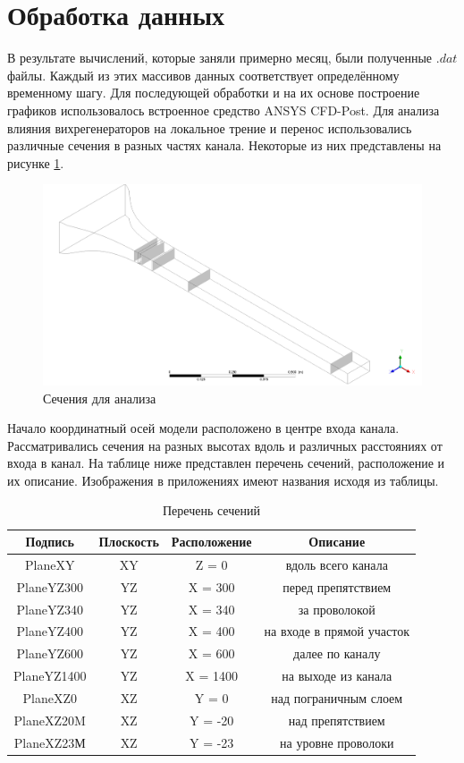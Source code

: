 \section{Обработка данных}
	В результате вычислений, которые заняли примерно месяц, были полученные $.dat$ файлы. Каждый из этих массивов данных соответствует определённому временному шагу. Для последующей обработки и на их основе построение графиков использовалось встроенное средство ANSYS CFD-Post. Для анализа влияния вихрегенераторов на локальное трение и перенос использовались различные сечения в разных частях канала. Некоторые из них представлены на рисунке \ref{fig:planesforanalysis}. 
	\begin{figure}[H]
		\centering
		\includegraphics[width=0.9\linewidth]{../Assets/1}
		\caption{Сечения для анализа}
		\label{fig:planesforanalysis}
	\end{figure}
	
	Начало координатный осей модели расположено в центре входа канала. Рассматривались сечения на разных высотах вдоль и различных расстояниях от входа в канал. На таблице ниже представлен перечень сечений, расположение и их описание. Изображения в приложениях имеют названия исходя из таблицы. %
	\begin{table}[H]
		\begin{center}
			\begin{tabular}{|c|c|c|c|}
				\hline
				Подпись & Плоскость & Расположение & Описание\\
				\hline
				PlaneXY & XY & Z = 0 & вдоль всего канала\\
				\hline
				PlaneYZ300 & YZ & X = 300 & перед препятствием\\
				\hline
				PlaneYZ340 & YZ & X = 340 & за проволокой\\
				\hline
				PlaneYZ400 & YZ & X = 400 & на входе в прямой участок\\
				\hline
				PlaneYZ600 & YZ & X = 600 & далее по каналу\\
				\hline
				PlaneYZ1400 & YZ & X = 1400 & на выходе из канала\\
				\hline
				PlaneXZ0 & XZ & Y = 0 & над пограничным слоем\\
				\hline
				PlaneXZ20M & XZ & Y = -20 & над препятствием\\
				\hline
				PlaneXZ23М & XZ & Y = -23 & на уровне проволоки\\
				\hline
			\end{tabular}
		\end{center}
		\label{tbl:sections}
		\caption{Перечень сечений}
	\end{table}
